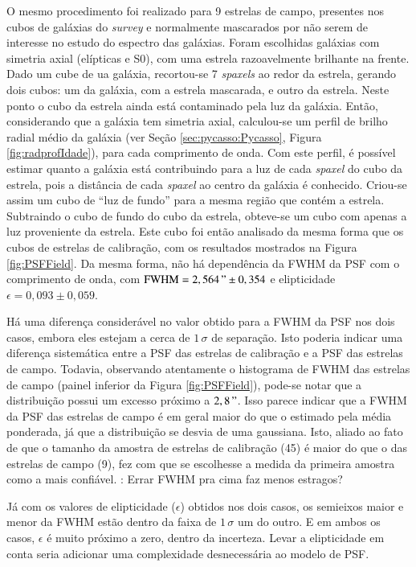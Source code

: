 O mesmo procedimento foi realizado para 9 estrelas de campo, presentes nos cubos
de galáxias do {\em survey} e normalmente mascarados por não serem de interesse
no estudo do espectro das galáxias. Foram escolhidas galáxias com simetria axial
(elípticas e S0), com uma estrela razoavelmente brilhante na frente.
Dado um cube de ua galáxia, recortou-se 7 {\em spaxels} ao redor da estrela,
gerando dois cubos: um da galáxia, com a estrela mascarada, e outro da estrela.
Neste ponto o cubo da estrela ainda está contaminado pela luz da galáxia. Então,
considerando que a galáxia tem simetria axial, calculou-se um perfil de brilho
radial médio da galáxia (ver Seção \ref{sec:pycasso:Pycasso}, Figura
\ref{fig:radprofIdade}), para cada comprimento de onda. Com este perfil, é
possível estimar quanto a galáxia está contribuindo para a luz de cada {\em
spaxel} do cubo da estrela, pois a distância de cada {\em spaxel} ao centro da
galáxia é conhecido. Criou-se assim um cubo de ``luz de fundo'' para a mesma
região que contém a estrela. Subtraindo o cubo de fundo do cubo da estrela,
obteve-se um cubo com apenas a luz proveniente da estrela.
Este cubo foi então analisado da mesma forma que os cubos de estrelas de
calibração, com os resultados mostrados na Figura \ref{fig:PSFField}. Da mesma
forma, não há dependência da FWHM da PSF com o comprimento de onda, com
$\mathrm{FWHM}=2,564\," \pm 0,354$ e elipticidade $\epsilon=0,093 \pm 0,059$.

Há uma diferença considerável no valor obtido para a FWHM da PSF nos dois casos,
embora eles estejam a cerca de $1\,\sigma$ de separação. Isto poderia indicar
uma diferença sistemática entre a PSF das estrelas de calibração e a PSF das
estrelas de campo. Todavia, observando atentamente o histograma de FWHM das
estrelas de campo (painel inferior da Figura \ref{fig:PSFField}), pode-se notar
que a distribuição possui um excesso próximo a $2,8\,"$. Isso parece indicar que
a FWHM da PSF das estrelas de campo é em geral maior do que o estimado pela
média ponderada, já que a distribuição se desvia de uma gaussiana. Isto, aliado
ao fato de que o tamanho da amostra de estrelas de calibração (45) é maior do
que o das estrelas de campo (9), fez com que se escolhesse a medida da primeira
amostra como a mais confiável. \TODO: Errar FWHM pra cima faz menos estragos?

Já com os valores de elipticidade ($\epsilon$) obtidos nos dois casos, os
semieixos maior e menor da FWHM estão dentro da faixa de $1\,\sigma$ um do
outro. E em ambos os casos, $\epsilon$ é muito próximo a zero, dentro da
incerteza. Levar a elipticidade em conta seria adicionar uma complexidade
desnecessária ao modelo de PSF.

